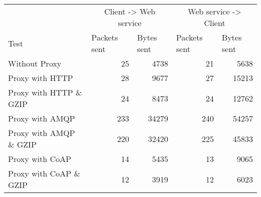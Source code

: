 \begin{tabular}{lrrrr}
\hline
\multicolumn{1}{l}{}                  & \multicolumn{2}{c}{Client -> Web service}                           & \multicolumn{2}{c}{Web service -> Client}                           \\
\multicolumn{1}{l}{Test} & \multicolumn{1}{l}{Packets sent} & \multicolumn{1}{l}{Bytes sent} & \multicolumn{1}{l}{Packets sent} & \multicolumn{1}{l}{Bytes sent} \\ \hline
Without Proxy                   & 25             & 4738           & 21             & 5638           \\
Proxy with HTTP                 & 28             & 9677           & 27             & 15213          \\
Proxy with HTTP \& GZIP         & 24             & 8473           & 24             & 12762          \\
Proxy with AMQP                 & 233            & 34279          & 240            & 54257          \\
Proxy with AMQP \& GZIP         & 220            & 32420          & 225            & 45833          \\
Proxy with CoAP                 & 14             & 5435           & 13             & 9065           \\
Proxy with CoAP \& GZIP         & 12             & 3919           & 12             & 6023           \\
\end{tabular}